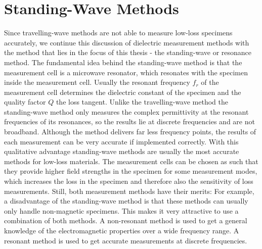 \section{Standing-Wave Methods}
Since travelling-wave methods are not able to measure low-loss specimens accurately, we continue this discussion of dielectric measurement methods with the method that lies in the focus of this thesis - the standing-wave or resonance method. The fundamental idea behind the standing-wave method is that the measurement cell is a microwave resonator, which resonates with the specimen inside the measurement cell. Usually the resonant frequency $f_r$ of the measurement cell determines the dielectric constant of the specimen and the quality factor $Q$ the loss tangent. Unlike the travelling-wave method the standing-wave method only measures the complex permittivity at the resonant frequencies of its resonances, so the results lie at discrete frequencies and are not broadband. Although the method delivers far less frequency points, the results of each measurement can be very accurate if implemented correctly. With this qualitative advantage standing-wave methods are usually the most accurate methods for low-loss materials. The measurement cells can be chosen as such that they provide higher field strengths in the specimen for some measurement modes, which increases the loss in the specimen and therefore also the sensitivity of loss measurements. Still, both measurement methods have their merits: For example, a disadvantage of the standing-wave method is that these methods can usually only handle non-magnetic specimens. This makes it very attractive to use a combination of both methods. A non-resonant method is used to get a general knowledge of the electromagnetic properties over a wide frequency range. A resonant method is used to get accurate measurements at discrete frequencies.

